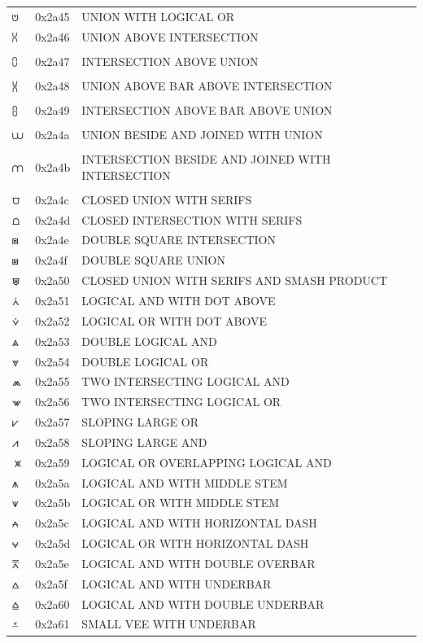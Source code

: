 \documentclass[12pt, twoside]{article}
\begin{document}
\begin{longtable}{L{1.0cm} L{2.0cm} >{\footnotesize}L{10cm}}
$⩅$&0x2a45&UNION WITH LOGICAL OR\\
$⩆$&0x2a46&UNION ABOVE INTERSECTION\\
\\
$⩇$&0x2a47&INTERSECTION ABOVE UNION\\
\\
$⩈$&0x2a48&UNION ABOVE BAR ABOVE INTERSECTION\\
\\
$⩉$&0x2a49&INTERSECTION ABOVE BAR ABOVE UNION\\
\\
$⩊$&0x2a4a&UNION BESIDE AND JOINED WITH UNION\\
\\
$⩋$&0x2a4b&INTERSECTION BESIDE AND JOINED WITH INTERSECTION\\
\\
$⩌$&0x2a4c&CLOSED UNION WITH SERIFS\\
$⩍$&0x2a4d&CLOSED INTERSECTION WITH SERIFS\\
$⩎$&0x2a4e&DOUBLE SQUARE INTERSECTION\\
$⩏$&0x2a4f&DOUBLE SQUARE UNION\\
$⩐$&0x2a50&CLOSED UNION WITH SERIFS AND SMASH PRODUCT\\
$⩑$&0x2a51&LOGICAL AND WITH DOT ABOVE\\
$⩒$&0x2a52&LOGICAL OR WITH DOT ABOVE\\
$⩓$&0x2a53&DOUBLE LOGICAL AND\\
$⩔$&0x2a54&DOUBLE LOGICAL OR\\
$⩕$&0x2a55&TWO INTERSECTING LOGICAL AND\\
$⩖$&0x2a56&TWO INTERSECTING LOGICAL OR\\
$⩗$&0x2a57&SLOPING LARGE OR\\
$⩘$&0x2a58&SLOPING LARGE AND\\
$⩙$&0x2a59&LOGICAL OR OVERLAPPING LOGICAL AND\\
$⩚$&0x2a5a&LOGICAL AND WITH MIDDLE STEM\\
$⩛$&0x2a5b&LOGICAL OR WITH MIDDLE STEM\\
$⩜$&0x2a5c&LOGICAL AND WITH HORIZONTAL DASH\\
$⩝$&0x2a5d&LOGICAL OR WITH HORIZONTAL DASH\\
$⩞$&0x2a5e&LOGICAL AND WITH DOUBLE OVERBAR\\
$⩟$&0x2a5f&LOGICAL AND WITH UNDERBAR\\
$⩠$&0x2a60&LOGICAL AND WITH DOUBLE UNDERBAR\\
$⩡$&0x2a61&SMALL VEE WITH UNDERBAR\\

\end{longtable}
\end{document}
